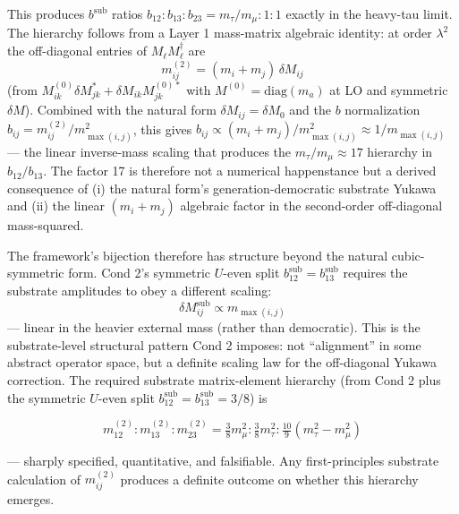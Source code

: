 \documentclass[
]{article}
\begin{document}
This produces \(b^{\text{sub}}\) ratios
\(b_{12} : b_{13} : b_{23} = m_\tau/m_\mu : 1 : 1\) exactly in the
heavy-tau limit. The hierarchy follows from a Layer 1 mass-matrix
algebraic identity: at order \(\lambda^2\) the off-diagonal entries of
\(M_\ell M_\ell^\dagger\) are
\[m^{(2)}_{ij} = (m_i + m_j)\,\delta M_{ij}\] (from
\(M^{(0)}_{ik}\delta M_{jk}^* + \delta M_{ik} M^{(0)*}_{jk}\) with
\(M^{(0)} = \mathrm{diag}(m_a)\) at LO and symmetric \(\delta M\)).
Combined with the natural form \(\delta M_{ij} = \delta M_0\) and the
\(b\) normalization \(b_{ij} = m^{(2)}_{ij}/m_{\max(i,j)}^2\), this
gives
\(b_{ij} \propto (m_i + m_j)/m_{\max(i,j)}^2 \approx 1/m_{\max(i,j)}\)
--- the linear inverse-mass scaling that produces the
\(m_\tau/m_\mu \approx 17\) hierarchy in \(b_{12}/b_{13}\). The factor
17 is therefore not a numerical happenstance but a derived consequence
of (i) the natural form's generation-democratic substrate Yukawa and
(ii) the linear \((m_i + m_j)\) algebraic factor in the second-order
off-diagonal mass-squared.

The framework's bijection therefore has structure beyond the natural
cubic-symmetric form. Cond 2's symmetric \(U\)-even split
\(b_{12}^{\text{sub}} = b_{13}^{\text{sub}}\) requires the substrate
amplitudes to obey a different scaling:
\[\delta M_{ij}^{\text{sub}} \propto m_{\max(i,j)}\] --- linear in the
heavier external mass (rather than democratic). This is the
substrate-level structural pattern Cond 2 imposes: not ``alignment'' in
some abstract operator space, but a definite scaling law for the
off-diagonal Yukawa correction. The required substrate matrix-element
hierarchy (from Cond 2 plus the symmetric \(U\)-even split
\(b_{12}^{\text{sub}} = b_{13}^{\text{sub}} = 3/8\)) is

\[m_{12}^{(2)} : m_{13}^{(2)} : m_{23}^{(2)} = \tfrac{3}{8}m_\mu^2 : \tfrac{3}{8}m_\tau^2 : \tfrac{10}{9}(m_\tau^2 - m_\mu^2)\]

--- sharply specified, quantitative, and falsifiable. Any
first-principles substrate calculation of \(m_{ij}^{(2)}\) produces a
definite outcome on whether this hierarchy emerges.
\end{document}

